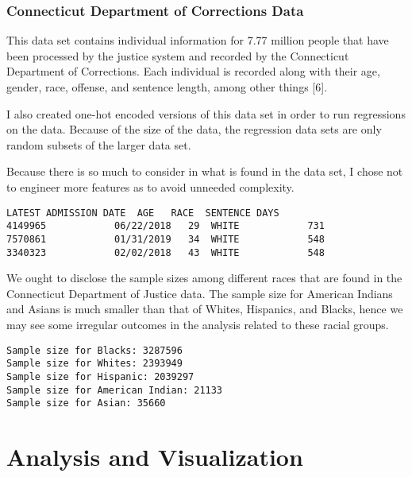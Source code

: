 \documentclass[11pt]{article}
\begin{document}
    \hypertarget{connecticut-department-of-corrections-data}{%
\subsubsection{Connecticut Department of Corrections
Data}\label{connecticut-department-of-corrections-data}}

    This data set contains individual information for 7.77 million people
that have been processed by the justice system and recorded by the
Connecticut Department of Corrections. Each individual is recorded along
with their age, gender, race, offense, and sentence length, among other
things {[}6{]}.

I also created one-hot encoded versions of this data set in order to run
regressions on the data. Because of the size of the data, the regression
data sets are only random subsets of the larger data set.

Because there is so much to consider in what is found in the data set, I
chose not to engineer more features as to avoid unneeded complexity.

    \begin{Verbatim}[commandchars=\\\{\}]
        LATEST ADMISSION DATE  AGE   RACE  SENTENCE DAYS
4149965            06/22/2018   29  WHITE            731
7570861            01/31/2019   34  WHITE            548
3340323            02/02/2018   43  WHITE            548

    \end{Verbatim}

    We ought to disclose the sample sizes among different races that are
found in the Connecticut Department of Justice data. The sample size for
American Indians and Asians is much smaller than that of Whites,
Hispanics, and Blacks, hence we may see some irregular outcomes in the
analysis related to these racial groups.

    \begin{Verbatim}[commandchars=\\\{\}]
Sample size for Blacks: 3287596
Sample size for Whites: 2393949
Sample size for Hispanic: 2039297
Sample size for American Indian: 21133
Sample size for Asian: 35660

    \end{Verbatim}

    \hypertarget{analysis-and-visualization}{%
\section{Analysis and Visualization}\label{analysis-and-visualization}}
\end{document}
